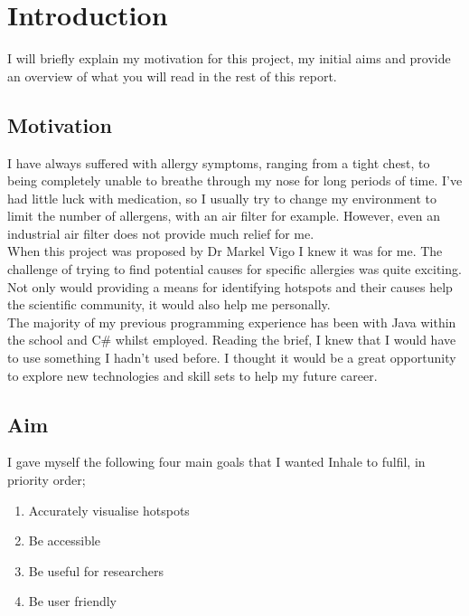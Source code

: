 \chapter{Introduction}
\label{cha:intro}

I will briefly explain my motivation for this project, my initial aims and provide an overview of what you will read in the rest of this report.

\section{Motivation} 

I have always suffered with allergy symptoms, ranging from a tight chest, to being completely unable to breathe through my nose for long periods of time. I've had little luck with medication, so I usually try to change my environment to limit the number of allergens, with an air filter for example. However, even an industrial air filter does not provide much relief for me.\\

When this project was proposed by Dr Markel Vigo I knew it was for me. The challenge of trying to find potential causes for specific allergies was quite exciting. Not only would providing a means for identifying hotspots and their causes help the scientific community, it would also help me personally.\\

The majority of my previous programming experience has been with Java within the school and C\# whilst employed. Reading the brief, I knew that I would have to use something I hadn't used before. I thought it would be a great opportunity to explore new technologies and skill sets to help my future career.\\

\section{Aim}
\label{sec:aim}

I gave myself the following four main goals that I wanted Inhale to fulfil, in priority order;

\begin{enumerate}
  \item Accurately visualise hotspots
  \item Be accessible
  \item Be useful for researchers
  \item Be user friendly
\end{enumerate}

